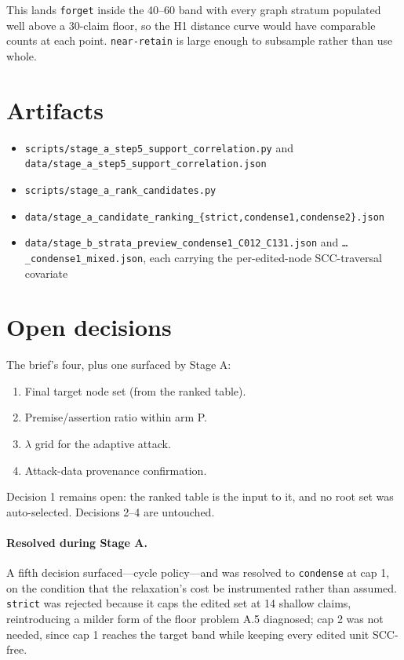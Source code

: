 \documentclass[11pt]{article}
\begin{document}
This lands \texttt{forget} inside the 40--60 band with every graph stratum
populated well above a 30-claim floor, so the H1 distance curve would have
comparable counts at each point. \texttt{near-retain} is large enough to
subsample rather than use whole.

\section{Artifacts}

\begin{itemize}[nosep]
  \item \texttt{scripts/stage\_a\_step5\_support\_correlation.py} and
        \texttt{data/stage\_a\_step5\_support\_correlation.json}
  \item \texttt{scripts/stage\_a\_rank\_candidates.py}
  \item \texttt{data/stage\_a\_candidate\_ranking\_\{strict,condense1,condense2\}.json}
  \item \texttt{data/stage\_b\_strata\_preview\_condense1\_C012\_C131.json} and
        \texttt{\dots\_condense1\_mixed.json}, each carrying the per-edited-node
        SCC-traversal covariate
\end{itemize}

\section{Open decisions}

The brief's four, plus one surfaced by Stage A:

\begin{enumerate}[nosep]
  \item Final target node set (from the ranked table).
  \item Premise/assertion ratio within arm P.
  \item $\lambda$ grid for the adaptive attack.
  \item Attack-data provenance confirmation.
\end{enumerate}

Decision 1 remains open: the ranked table is the input to it, and no root set was
auto-selected. Decisions 2--4 are untouched.

\paragraph{Resolved during Stage A.}
A fifth decision surfaced---cycle policy---and was resolved to
\texttt{condense} at cap 1, on the condition that the relaxation's cost be
instrumented rather than assumed. \texttt{strict} was rejected because it caps the
edited set at 14 shallow claims, reintroducing a milder form of the floor problem
A.5 diagnosed; cap 2 was not needed, since cap 1 reaches the target band while
keeping every edited unit SCC-free.
\end{document}
